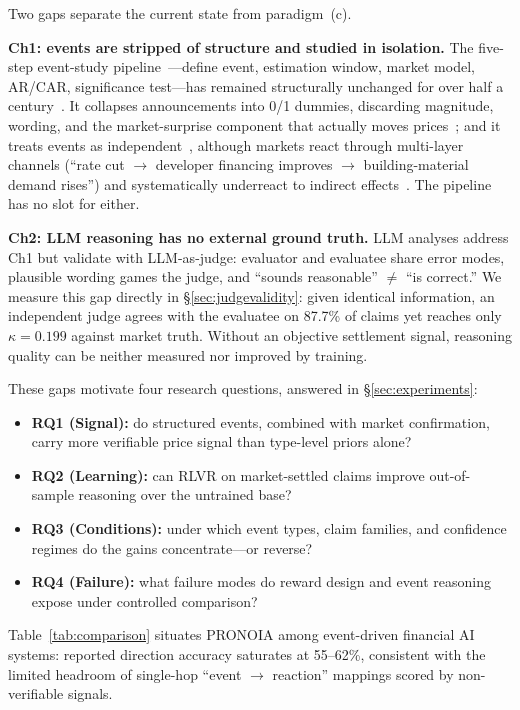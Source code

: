 \documentclass[sigconf, anonymous, review]{acmart}
\begin{document}
Two gaps separate the current state from paradigm~(c).

\textbf{Ch1: events are stripped of structure and studied in isolation.} The five-step event-study pipeline~\cite{fama1969}---define event, estimation window, market model, AR/CAR, significance test---has remained structurally unchanged for over half a century~\cite{ball1968}. It collapses announcements into 0/1 dummies, discarding magnitude, wording, and the market-surprise component that actually moves prices~\cite{kuttner2001}; and it treats events as independent~\cite{kolari2010}, although markets react through multi-layer channels (``rate cut $\to$ developer financing improves $\to$ building-material demand rises'') and systematically underreact to indirect effects~\cite{cohen2008}. The pipeline has no slot for either.

\textbf{Ch2: LLM reasoning has no external ground truth.} LLM analyses address Ch1 but validate with LLM-as-judge: evaluator and evaluatee share error modes, plausible wording games the judge, and ``sounds reasonable'' $\neq$ ``is correct.'' We measure this gap directly in \S\ref{sec:judgevalidity}: given identical information, an independent judge agrees with the evaluatee on 87.7\% of claims yet reaches only $\kappa = 0.199$ against market truth. Without an objective settlement signal, reasoning quality can be neither measured nor improved by training.

These gaps motivate four research questions, answered in \S\ref{sec:experiments}:
\begin{itemize}
    \item \textbf{RQ1 (Signal):} do structured events, combined with market confirmation, carry more verifiable price signal than type-level priors alone?
    \item \textbf{RQ2 (Learning):} can RLVR on market-settled claims improve out-of-sample reasoning over the untrained base?
    \item \textbf{RQ3 (Conditions):} under which event types, claim families, and confidence regimes do the gains concentrate---or reverse?
    \item \textbf{RQ4 (Failure):} what failure modes do reward design and event reasoning expose under controlled comparison?
\end{itemize}

Table~\ref{tab:comparison} situates PRONOIA among event-driven financial AI systems: reported direction accuracy saturates at 55--62\%, consistent with the limited headroom of single-hop ``event $\to$ reaction'' mappings scored by non-verifiable signals.
\end{document}
